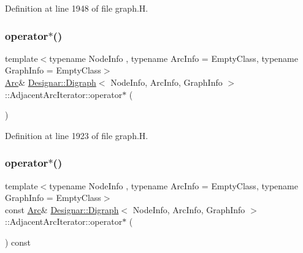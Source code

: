 Definition at line 1948 of file graph.\+H.

\mbox{\label{class_designar_1_1_digraph_1_1_adjacent_arc_iterator_a2a1ee85a8076e07fd99d35676ec69887}} 
\subsubsection{\texorpdfstring{operator$\ast$()}{operator*()}\hspace{0.1cm}{\footnotesize\ttfamily [1/2]}}
{\footnotesize\ttfamily template$<$typename Node\+Info , typename Arc\+Info  = Empty\+Class, typename Graph\+Info  = Empty\+Class$>$ \\
\hyperlink{class_designar_1_1_digraph_a0ceb278671f2a535c00fddccdeafd69f}{Arc}\& \hyperlink{class_designar_1_1_digraph}{Designar\+::\+Digraph}$<$ Node\+Info, Arc\+Info, Graph\+Info $>$\+::Adjacent\+Arc\+Iterator\+::operator$\ast$ (\begin{DoxyParamCaption}{ }\end{DoxyParamCaption})\hspace{0.3cm}{\ttfamily [inline]}}



Definition at line 1923 of file graph.\+H.

\mbox{\label{class_designar_1_1_digraph_1_1_adjacent_arc_iterator_aaf54c97702c3b6e3ccf419c2f7966e44}} 
\subsubsection{\texorpdfstring{operator$\ast$()}{operator*()}\hspace{0.1cm}{\footnotesize\ttfamily [2/2]}}
{\footnotesize\ttfamily template$<$typename Node\+Info , typename Arc\+Info  = Empty\+Class, typename Graph\+Info  = Empty\+Class$>$ \\
const \hyperlink{class_designar_1_1_digraph_a0ceb278671f2a535c00fddccdeafd69f}{Arc}\& \hyperlink{class_designar_1_1_digraph}{Designar\+::\+Digraph}$<$ Node\+Info, Arc\+Info, Graph\+Info $>$\+::Adjacent\+Arc\+Iterator\+::operator$\ast$ (\begin{DoxyParamCaption}{ }\end{DoxyParamCaption}) const\hspace{0.3cm}{\ttfamily [inline]}}



